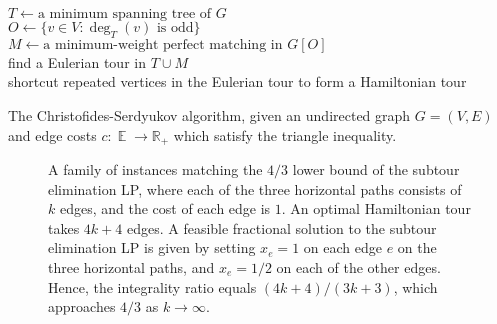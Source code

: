 \documentclass[letterpaper, reqno,12pt]{article}
\newcommand{\RR}{\mathbb{R}}
\newcommand{\EE}{\mathop{{}\mathbb{E}}}
\begin{document}
\begin{algorithm}[h]
  $T \leftarrow \text{a minimum spanning tree of $G$}$ \\
  $O \leftarrow \{ v \in V : \deg_T(v) \text{ is odd} \}$ \\
  $M \leftarrow \text{a minimum-weight perfect matching in $G[O]$}$ \\
  find a Eulerian tour in $T \cup M$ \\
  shortcut repeated vertices in the Eulerian tour to form a Hamiltonian tour
  \caption{The Christofides-Serdyukov algorithm, given an undirected graph $G = (V, E)$ and edge costs $c : \EE \to \RR_+$ which satisfy the triangle inequality.}
  \label{alg:christofides-serdyukov}
\end{algorithm}

\begin{figure}[h]
  \centering
  \caption{A family of instances matching the $4/3$ lower bound of the subtour elimination LP, where each of the three horizontal paths consists of $k$ edges, and the cost of each edge is $1$. An optimal Hamiltonian tour takes $4k + 4$ edges. A feasible fractional solution to the subtour elimination LP is given by setting $x_e = 1$ on each edge $e$ on the three horizontal paths, and $x_e = 1/2$ on each of the other edges. Hence, the integrality ratio equals $(4k + 4)/(3k + 3)$, which approaches $4/3$ as $k \to \infty$.}
  \label{fig:envelope}
\end{figure}
\end{document}
